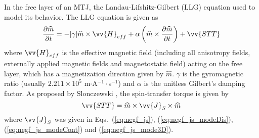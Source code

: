 In the free layer of an MTJ, the Landau-Lifshitz-Gilbert (LLG) equation used to model its behavior. The LLG equation is given as \begin{equation}
\frac{\partial\widehat{m}}{\partial t} = -|\gamma| \widehat{m}\times\vv{H}_{eff} + \alpha\left(\widehat{m}\times\frac{\partial\widehat{m}}{\partial t}\right) + \vv{STT}
\end{equation}where $\vv{H}_{eff}$ is the effective magnetic field (including all anisotropy fields, externally applied magnetic fields and magnetostatic field) acting on the free layer, which has a magnetization direction given by $\widehat{m}$. $\gamma$ is the gyromagnetic ratio (usually $2.211\times10^{5}$ m$\cdot$A$^{-1}\cdot$s$^{-1}$) and $\alpha$ is the unitless Gilbert's damping factor. As proposed by Slonczewski \cite{Slonczewski1996c}, the spin-transfer torque is given by \begin{equation}
\vv{STT}=\widehat{m}\times\vv{J}_{S}\times\widehat{m}
\end{equation}where $\vv{J}_{S}$ was given in Eqs.~(\ref{eq:negf_js}), (\ref{eq:negf_js_modeDis}), (\ref{eq:negf_js_modeCont}) and (\ref{eq:negf_js_mode3D}).

